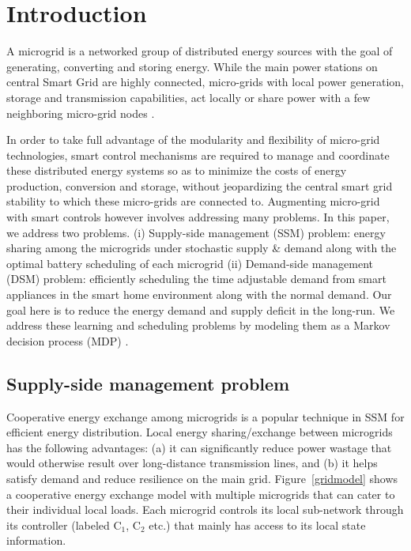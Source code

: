 \section{Introduction}

A microgrid is a networked group of distributed energy sources with the goal of generating, converting and storing energy. While the main power stations on central Smart Grid are highly connected, micro-grids with local power generation, storage and transmission capabilities, act locally or share power with a few neighboring micro-grid nodes \cite{farhangi2010path}.

In order to take full advantage of the modularity and flexibility of micro-grid technologies, smart control mechanisms are required to manage and coordinate these distributed energy systems so as to minimize the costs of energy production, conversion and storage, without jeopardizing the central smart grid stability to which these micro-grids are connected to. Augmenting micro-grid with smart controls however involves addressing many problems. In this paper, we address two  problems. (i) Supply-side management (SSM) problem: energy sharing among the microgrids under stochastic supply \& demand along with the optimal battery scheduling of each microgrid (ii) Demand-side management (DSM) problem: efficiently scheduling the time adjustable demand from smart appliances in the smart home environment along with the normal demand. Our goal here is to reduce the energy demand and supply deficit in the long-run. We address these learning and scheduling problems by modeling them as a Markov decision process (MDP) \cite{puterman2014markov}.

\subsection{Supply-side management problem}
Cooperative energy exchange among microgrids is a popular technique in SSM for efficient energy distribution.  Local energy sharing/exchange between microgrids has the following advantages:
(a) it can significantly reduce power wastage that would otherwise result over long-distance transmission lines, and (b) it helps satisfy demand and reduce resilience on the main grid. Figure~\ref{gridmodel} shows a cooperative energy exchange model with multiple microgrids that can cater to their individual local loads. Each microgrid controls its local sub-network through its controller (labeled $\mbox{C}_1$, $\mbox{C}_2$ etc.) that mainly has access to its local state information.


